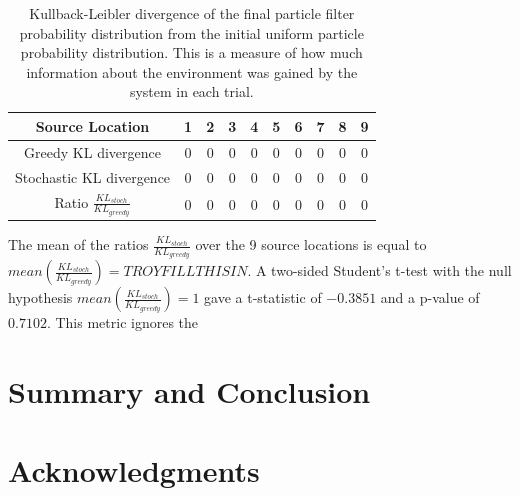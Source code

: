 \documentclass[submit]{aiaa-pretty-modified}
\begin{document}
\begin{table}[htb]
\begin{center}
\begin{tabular}{|c||c||c||c||c||c||c||c||c||c|}
\hline
 Source Location & 1 & 2 & 3 & 4 & 5 & 6 & 7 & 8 & 9 \\
\hline \hline
Greedy KL divergence & 0 & 0 & 0 & 0 & 0 & 0 & 0 & 0 & 0 \\
\hline
Stochastic KL divergence & 0 & 0 & 0 & 0 & 0 & 0 & 0 & 0 & 0 \\
\hline
Ratio $\frac{KL_{stoch}}{KL_{greedy}}$ & 0 & 0 & 0 & 0 & 0 & 0 & 0 & 0 & 0 \\
\hline
\end{tabular}
\caption{Kullback-Leibler divergence of the final particle filter
  probability distribution from the initial uniform particle
  probability distribution.  This is a measure of how much
  information about the environment was gained by the system in each trial. \label{tab:allinfo} }
\end{center}
\end{table}

The mean of the ratios $\frac{KL_{stoch}}{KL_{greedy}}$ over the 9
source locations is equal to $mean(\frac{KL_{stoch}}{KL_{greedy}}) =
TROYFILLTHISIN$.  A two-sided Student's t-test with the null hypothesis
$mean(\frac{KL_{stoch}}{KL_{greedy}}) = 1$ gave a t-statistic of
$-0.3851$ and a p-value of $0.7102$.  This metric ignores the 



\section{Summary and Conclusion}

\section{Acknowledgments}

\newpage


\nocite{*}
\end{document}
